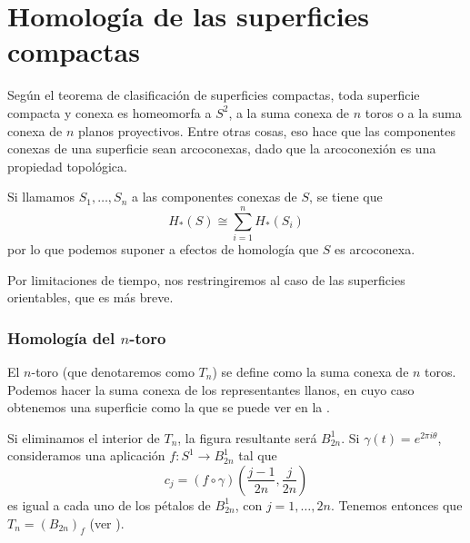 \setchapterpreamble[u]{\margintoc}

\chapter{Homología de las superficies compactas}
Según el teorema de clasificación de superficies compactas, toda superficie
compacta y conexa es homeomorfa a $S^2$, a la suma conexa de $n$ toros o a la
suma conexa de $n$ planos proyectivos. Entre otras cosas, eso hace que las
componentes conexas de una superficie sean arcoconexas, dado que la
arcoconexión es una propiedad topológica.

Si llamamos $S_1,\dots,S_n$ a las componentes conexas de $S$, se tiene que
\[H_*(S)\cong \sum^n_{i=1}H_*(S_i)\]
por lo que podemos suponer a efectos de homología que $S$ es arcoconexa.

Por limitaciones de tiempo, nos restringiremos al caso de las superficies
orientables, que es más breve.

\subsection{Homología del $n$-toro}
El $n$-toro (que denotaremos como $T_n$) se define como la suma conexa de $n$
toros. Podemos hacer la suma conexa de los representantes llanos, en cuyo caso
obtenemos una superficie como la que se puede ver en la .

Si eliminamos el interior de $T_n$, la figura resultante será $B^1_{2n}$.  Si
$\gamma(t)=e^{2\pi i\theta}$, consideramos una aplicación $f\colon S^1\to
B_{2n}^1$ tal que
\[c_j=(f\circ\gamma)\left(\frac{j-1}{2n},\frac{j}{2n}\right)\]
es igual a cada uno de los pétalos de $B^1_{2n}$, con $j=1,\dots,2n$. Tenemos
entonces que $T_n=(B_{2n})_f$ (ver ). 


